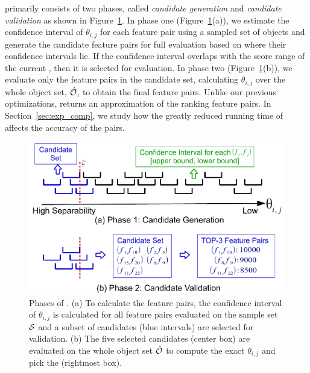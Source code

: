  \sampling primarily consists of two phases, called {\em candidate generation} and {\em candidate validation} as shown in Figure~\ref{fig:sampling}. In phase one (Figure~\ref{fig:sampling}(a)), we estimate the confidence interval of $\theta_{i,j}$ for each feature pair using a sampled set of objects and generate the candidate feature pairs for full evaluation based on where their confidence intervals lie. If the confidence interval overlaps with the score range of the current \topk, then it is selected for evaluation. In phase two (Figure~\ref{fig:sampling}(b)), we evaluate only the feature pairs in the candidate set, calculating $\theta_{i,j}$ over the whole object set, $\hat{{\mathcal{O}}}$, to obtain the final \topk feature pairs. Unlike our previous optimizations, \sampling returns an approximation of the \topk ranking feature pairs. In Section~\ref{sec:exp_comp}, we study how the greatly reduced running time of \sampling affects the accuracy of the \topk pairs. %

\begin{figure}[t!]
 \centering
 \vspace{-2mm}
 \includegraphics[width=\linewidth]{fig/sampling.pdf}
 \vspace{-9mm}
\caption{Phases of \sampling. (a) To calculate the \topthree feature pairs, the confidence interval of $\theta_{i,j}$ is calculated for all feature pairs evaluated on the sample set ${\mathcal{S}}$ and a subset of candidates (blue intervals) are selected for validation. (b) The five selected candidates (center box) are evaluated on the whole object set $\hat{{\mathcal{O}}}$ to compute the exact $\theta_{i,j}$ and pick the \topthree (rightmost box).}
\vspace{-5mm}
\label{fig:sampling}
\end{figure}

